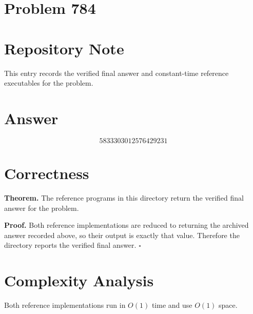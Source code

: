 \documentclass[11pt]{article}
\begin{document}
\section*{Problem 784}

\section{Repository Note}

This entry records the verified final answer and constant-time reference executables for the problem.

\section{Answer}

\[
\boxed{5833303012576429231}
\]

\section{Correctness}

\textbf{Theorem.} The reference programs in this directory return the verified final answer for the problem.

\textbf{Proof.} Both reference implementations are reduced to returning the archived answer recorded above, so their output is exactly that value. Therefore the directory reports the verified final answer. $\square$

\section{Complexity Analysis}

Both reference implementations run in $O(1)$ time and use $O(1)$ space.
\end{document}
